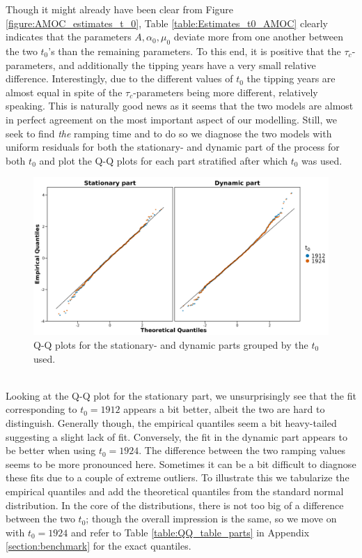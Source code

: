 Though it might already have been clear from Figure \ref{figure:AMOC_estimates_t_0}, Table \ref{table:Estimates_t0_AMOC} clearly indicates that the parameters $A, \alpha_0, \mu_0$ deviate more from one another between the two $t_0$'s than the remaining parameters. To this end, it is positive that the $\tau_c$-parameters, and additionally the tipping years have a very small relative difference. Interestingly, due to the different values of $t_0$ the tipping years are almost equal in spite of the $\tau_c$-parameters being more different, relatively speaking. This is naturally good news as it seems that the two models are almost in perfect agreement on the most important aspect of our modelling. Still, we seek to find \textit{the} ramping time and to do so we diagnose the two models with uniform residuals for both the stationary- and dynamic part of the process for both $t_0$ and plot the Q-Q plots for each part stratified after which $t_0$ was used.
\begin{figure}[h!]
    \begin{center}
        \includegraphics[scale = .09]{figures/QQ_plot_parts.jpeg}
        \caption{Q-Q plots for the stationary- and dynamic parts grouped by the $t_0$ used.}
        \label{figure:AMOC_QQ_t_0}
    \end{center}
\end{figure}\\
Looking at the Q-Q plot for the stationary part, we unsurprisingly see that the fit corresponding to $t_0 = 1912$ appears a bit better, albeit the two are hard to distinguish. Generally though, the empirical quantiles seem a bit heavy-tailed suggesting a slight lack of fit. Conversely, the fit in the dynamic part appears to be better when using $t_0 = 1924$. The difference between the two ramping values seems to be more pronounced here. Sometimes it can be a bit difficult to diagnose these fits due to a couple of extreme outliers. To illustrate this we tabularize the empirical quantiles and add the theoretical quantiles from the standard normal distribution. In the core of the distributions, there is not too big of a difference between the two $t_0$; though the overall impression is the same, so we move on with $t_0 = 1924$ and refer to Table \ref{table:QQ_table_parts} in Appendix \ref{section:benchmark} for the exact quantiles.\newpage 
